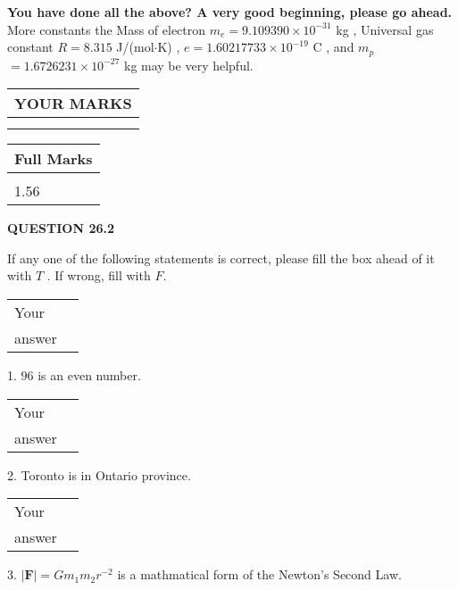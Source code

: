 \documentclass[12pt]{article}
\begin{document}
   
\vspace{0.3in}
{\textbf{\LARGE{You have done all the above? A very good beginning, please go ahead.}}}
More constants the
Mass of electron
$m_e$$ =
9.109390 \times 10^{-31} $
kg
,
Universal gas constant
$R$$ =
8.315 $
J/(mol$\cdot $K)
,
$e$$ =
1.60217733 \times 10^{-19} $
C
, and
$m_p$$ =
1.6726231 \times 10^{-27} $
kg
%
may be very helpful.
\vspace{0.3in}
   
   
  
\vspace{0.2in}
  
\noindent\begin{tabular}{|l|}
\hline
 YOUR MARKS  \\
\hline
 \\ 
 \\ 
\hline
\end{tabular}
\hspace{0.05in} \begin{tabular}{|l|}
\hline
 Full Marks  \\
\hline
 \\ 
1.56 \\
\hline
\end{tabular}
{\textbf{\Large{QUESTION
26.2 
}}}
  
  
If any one of the following statements is correct, please fill the box ahead of it with $T$ .
If wrong, fill with $F$.
 
\noindent\begin{tabular}{|l|l|}\hline Your&\hspace{.2in} \\ answer&\hspace{.2in} \\ \hline \end{tabular}
1. $ %
96$ is an  %
even number.
 
\noindent\begin{tabular}{|l|l|}\hline Your&\hspace{.2in} \\ answer&\hspace{.2in} \\ \hline \end{tabular}
2.  %
Toronto is in  %
Ontario province.
 
\noindent\begin{tabular}{|l|l|}\hline Your&\hspace{.2in} \\ answer&\hspace{.2in} \\ \hline \end{tabular}
3.  %
$\left| \mathbf{F}\right| =Gm_1m_2r^{-2}$ is a mathmatical form of
the Newton's Second Law.
 
\end{document}
